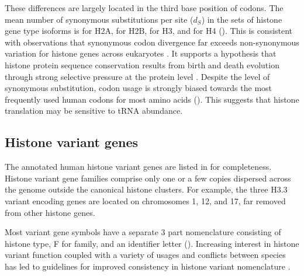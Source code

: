     These differences are largely located in the third base position of codons.
    The mean number of synonymous substitutions per site ($d_S$)
    in the sets of histone gene type isoforms is
     \result{} for H2A,
     \result{} for H2B,
     \result{} for H3,
    and  \result{} for H4 ().
    This is consistent with observations that
    synonymous codon divergence far exceeds non-synonymous variation
    for histone genes across eukaryotes \citep{Piontkivska2002, Rooney2002}.
    It supports a hypothesis that histone protein sequence conservation
    results from birth and death evolution through strong selective pressure
    at the protein level \citep{NeiRooney2005}.
    Despite the level of synonymous substitution,
    codon usage is strongly biased towards the most frequently used
    human codons for most amino acids ().
    This suggests that histone translation may be sensitive to tRNA abundance.

  \subsection{Histone variant genes}
    The \TotalCoreVariantGenes{} annotated human histone variant genes
    are listed in  for completeness.
    Histone variant gene families comprise only one or a few copies
    dispersed across the genome outside the canonical histone clusters.
    For example, the three H3.3 variant encoding genes are located
    on chromosomes 1, 12, and 17, far removed from other histone genes.

    Most variant gene symbols have a separate 3 part nomenclature
    consisting of histone type, F for family,
    and an identifier letter ().
    Increasing interest in histone variant function \citep{MazeAllis2014}
    coupled with a variety of usages and conflicts between species
    has led to guidelines for improved consistency in histone variant nomenclature
    \citep{Talbert2012}.
